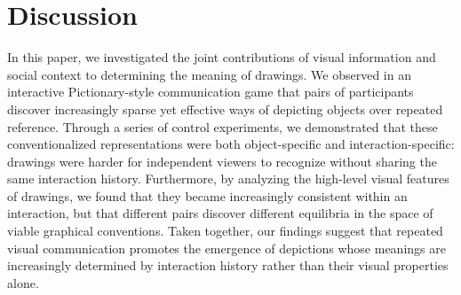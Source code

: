 \documentclass[11pt,letterpaper]{article}
\newcommand{\jefan}[1]{\textcolor{Blue}{jefan: #1}}
\begin{document}



\section{Discussion}

In this paper, we investigated the joint contributions of visual information and social context to determining the meaning of drawings.
We observed in an interactive Pictionary-style communication game that pairs of participants discover increasingly sparse yet effective ways of depicting objects over repeated reference.
Through a series of control experiments, we demonstrated that these conventionalized representations were both object-specific and interaction-specific: drawings were harder for independent viewers to recognize without sharing the same interaction history.
Furthermore, by analyzing the high-level visual features of drawings, we found that they became increasingly consistent within an interaction, but that different pairs discover different equilibria in the space of viable graphical conventions.
Taken together, our findings suggest that repeated visual communication promotes the emergence of depictions whose meanings are increasingly determined by interaction history rather than their visual properties alone.
\end{document}
